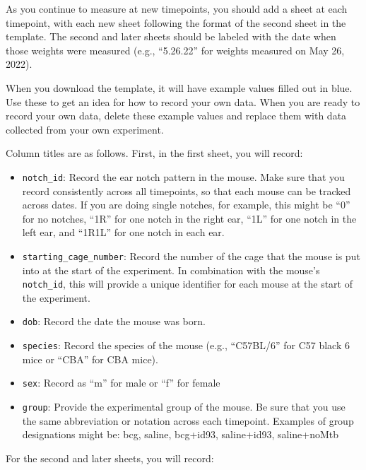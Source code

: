 \documentclass[
]{book}
\providecommand{\tightlist}{%
  \setlength{\itemsep}{0pt}\setlength{\parskip}{0pt}}
\begin{document}
As you continue to measure at new timepoints, you should add a sheet at each
timepoint, with each new sheet following the format of the second sheet in the
template. The second and later sheets should be labeled with the date when those
weights were measured (e.g., ``5.26.22'' for weights measured on May 26, 2022).

When you download the template, it will have example values filled out in blue.
Use these to get an idea for how to record your own data. When you are ready
to record your own data, delete these example values and replace them with
data collected from your own experiment.

Column titles are as follows. First, in the first sheet, you will record:

\begin{itemize}
\tightlist
\item
  \texttt{notch\_id}: Record the ear notch pattern in the mouse. Make sure that you
  record consistently across all timepoints, so that each mouse can be tracked
  across dates. If you are doing single notches, for example, this might be ``0''
  for no notches, ``1R'' for one notch in the right ear, ``1L'' for one notch in the
  left ear, and ``1R1L'' for one notch in each ear.
\item
  \texttt{starting\_cage\_number}: Record the number of the cage that the mouse is put
  into at the start of the experiment. In combination with the mouse's \texttt{notch\_id},
  this will provide a unique identifier for each mouse at the start of the
  experiment.
\item
  \texttt{dob}: Record the date the mouse was born.
\item
  \texttt{species}: Record the species of the mouse (e.g., ``C57BL/6'' for C57 black 6 mice or
  ``CBA'' for CBA mice).
\item
  \texttt{sex}: Record as ``m'' for male or ``f'' for female
\item
  \texttt{group}: Provide the experimental group of the mouse. Be sure that you use the
  same abbreviation or notation across each timepoint. Examples of group
  designations might be: bcg, saline, bcg+id93, saline+id93, saline+noMtb
\end{itemize}

For the second and later sheets, you will record:
\end{document}
